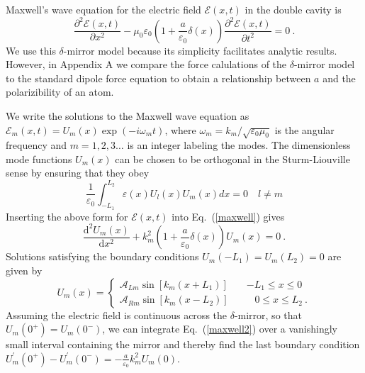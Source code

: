 \documentclass[twocolumn,english,pra,aps,superscriptaddress,floatfix]{revtex4-1}
\begin{document}
Maxwell's wave equation for the electric field $\mathcal{E}(x,t)$ in the double cavity is
\begin{equation}
\frac{\partial^{2}\mathcal{E}(x,t)}{\partial x^{2}}-\mu_{0}\varepsilon_{0}(1+\frac{a}{\varepsilon_{0}}\delta(x))\frac{\partial^{2}\mathcal{E}(x,t)}{\partial t^{2}}=0 \ .
\label{maxwell}
\end{equation}
We use this $\delta$-mirror model because its simplicity facilitates analytic results. However, in Appendix A we compare the force calulations of the $\delta$-mirror model to the standard dipole force equation to obtain a relationship between $a$ and the polarizibility of an atom.   


We write the solutions to the Maxwell wave equation as $\mathcal{E}_{m}(x,t)=U_{m}(x) \exp(-i\omega_{m}t)$,  where $\omega_{m}=k_{m}/\sqrt{\varepsilon_{0}\mu_{0}}$ is the angular frequency and $m=1,2,3 \ldots$ is an integer labeling the modes. The dimensionless mode functions $U_{m}(x)$ can be chosen to be orthogonal
in the Sturm-Liouville sense by ensuring that they obey
\begin{equation}
\frac{1}{\varepsilon_{0}}\int_{-L_{1}}^{L_{2}}\varepsilon(x)U_{l}(x)U_{m}(x)dx=0 \quad  l\neq m
\label{normalization}
\end{equation}
Inserting the above form for $\mathcal{E}(x,t)$ into Eq.\ (\ref{maxwell}) gives
\begin{equation}
\frac{\mathrm{d}^{2}U_{m}(x)}{\mathrm{d}x^{2}}+k_{m}^{2}(1+\frac{a}{\varepsilon_{0}}\delta(x))U_{m}(x)=0 \ .
\label{maxwell2}
\end{equation}
Solutions satisfying the boundary conditions $U_{m}(-L_{1})=U_{m}(L_{2})=0$
are given by
\begin{equation}
U_{m}(x)=\begin{cases}
\mathcal{A}_{Lm}\sin \left[k_{m}(x+L_{1})\right]\quad & -L_{1} \leq x\leq0\\
\mathcal{A}_{Rm}\sin \left[k_{m}(x-L_{2})\right]\quad & \,\:\:\:0 \leq x \leq L_{2} \ . \end{cases}
\label{Wavemode}
\end{equation}
Assuming the electric field is continuous across
the $\delta$-mirror, so that $U_{m}(0^{+})=U_{m}(0^{-})$, we can integrate Eq.\ (\ref{maxwell2}) over a vanishingly small interval containing the mirror and thereby find the last boundary condition
$U_{m}^{\prime}(0^{+})-U_{m}^{\prime}(0^{-})=-\frac{a}{\varepsilon_{0}} k_{m}^{2}U_{m}(0)$.
\end{document}
